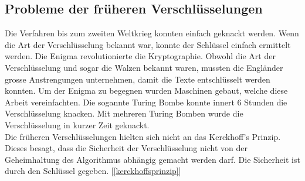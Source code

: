\subsection{Probleme der früheren Verschlüsselungen}
Die Verfahren bis zum zweiten Weltkrieg konnten einfach geknackt werden. Wenn die Art der Verschlüsselung bekannt war, konnte der Schlüssel einfach ermittelt werden. 
Die Enigma revolutionierte die Kryptographie. Obwohl die Art der Verschlüsselung und sogar die Walzen bekannt waren, mussten die Engländer grosse Anstrengungen unternehmen, damit die Texte entschlüsselt werden konnten. Um der Enigma zu begegnen wurden Maschinen gebaut, welche diese Arbeit vereinfachten. Die sogannte Turing Bombe konnte innert 6 Stunden die Verschlüsselung knacken. 
Mit mehreren Turing Bomben wurde die Verschlüsselung in kurzer Zeit geknackt. \\[2ex]
%
Die früheren Verschlüsselungen hielten sich nicht an das Kerckhoff's Prinzip. Dieses besagt, dass die Sicherheit der Verschlüsselung nicht von der Geheimhaltung des Algorithmus abhängig gemacht werden darf. Die Sicherheit ist durch den Schlüssel gegeben. [\ref{kerckhoffsprinzip}]
%
